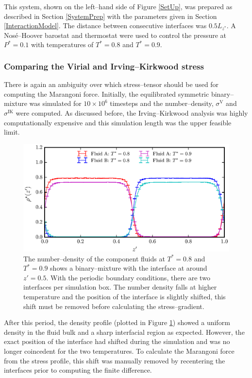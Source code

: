 This system, shown on the left--hand side of Figure \ref{SetUp}, was prepared as described in Section \ref{SystemPrep} with the parameters given in Section \ref{InteractionModel}.
The distance between consecutive interfaces was $0.5 L_{z^{*}}$.
A Nos\'{e}--Hoover barostat and thermostat were used to control the pressure at $P^{*} = 0.1$ with temperatures of $T^{*}=0.8$ and $T^{*}=0.9$.

\subsubsection{Comparing the Virial and Irving--Kirkwood stress}
There is again an ambiguity over which stress--tensor should be used for computing the Marangoni force.
Initially, the equilibrated symmetric binary--mixture was simulated for $10 \times 10^{6}$ timesteps and the number--density, $\sigma^{\mathrm{V}}$ and $\sigma^{\mathrm{IK}}$ were computed.
As discussed before, the Irving--Kirkwood analysis was highly computationally expensive and this simulation length was the upper feasible limit.
\FloatBarrier

\begin{figure}[h]
\centering
\includegraphics[scale=0.8]{Period10Rho}
\caption{The number--density of the component fluids at $T^{*}=0.8$ and $T^{*}=0.9$ shows a binary--mixture with the interface at around $z'=0.5$.
With the periodic boundary conditions, there are two interfaces per simulation box.
The number density falls at higher temperature and the position of the interface is slightly shifted, this shift must be removed before calculating the stress--gradient.}
\label{Period10Rho}
\end{figure}
After this period, the density profile (plotted in Figure \ref{Period10Rho}) showed a uniform density in the fluid bulk and a sharp interfacial region as expected.
However, the exact position of the interface had shifted during the simulation and was no longer coincedent for the two temperatures.
To calculate the Marangoni force from the stress profile, this shift was manually removed by recentering the interfaces prior to computing the finite difference.
\FloatBarrier

